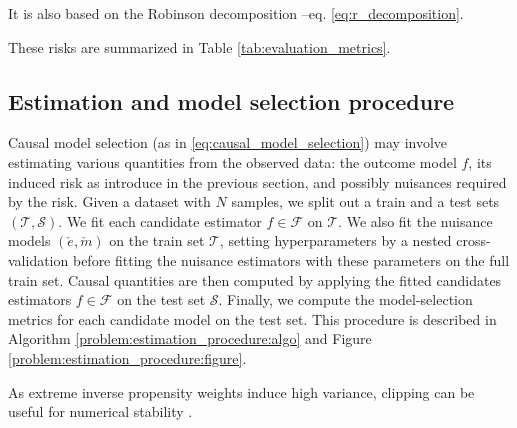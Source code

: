 \documentclass{report}
\begin{document}
It is also based on the Robinson decomposition --eq. \ref{eq:r_decomposition}. %

These risks are summarized in Table \ref{tab:evaluation_metrics}.


\subsection{Estimation and model selection procedure}\label{problem:estimation_procedure}

Causal model selection (as in
\autoref{eq:causal_model_selection}) may involve estimating various quantities
from the observed data: the outcome model $f$, its induced risk as
introduce in the previous section, and possibly nuisances required by the
risk.
Given a dataset with $N$ samples, we split out a train and a test sets
$(\mathcal{T}, \mathcal{S})$. We
fit each candidate estimator $f \in \mathcal{F}$ on $\mathcal{T}$. We also fit
the nuisance models $(\check e, \check m)$ on the train set
$\mathcal{T}$, setting hyperparameters by a nested
cross-validation before fitting the nuisance estimators with these parameters
on the full train set. Causal quantities are then computed by applying the fitted  candidates
estimators $f \in \mathcal{F}$ on the test set $\mathcal{S}$. Finally, we
compute the model-selection metrics for
each candidate model on the test set. This procedure is described in Algorithm
\ref{problem:estimation_procedure:algo} and Figure
\ref{problem:estimation_procedure:figure}.

As extreme inverse propensity weights induce high variance, clipping can be
useful for numerical stability
\citep{swaminathan_counterfactual_2015, ionides_truncated_2008}.
\end{document}
